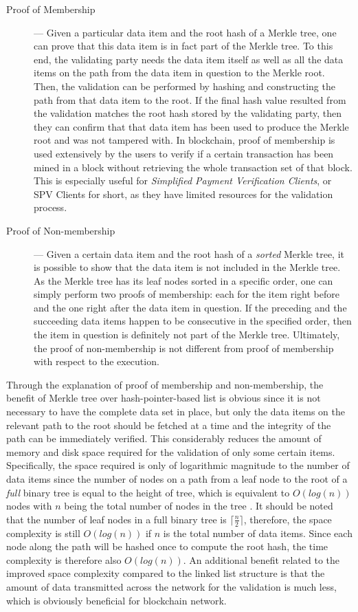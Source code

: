 \begin{description}
	\item[Proof of Membership] --- Given a particular data item and the root hash of a Merkle tree, one can prove that this data item is in fact part of the Merkle tree. To this end, the validating party needs the data item itself as well as all the data items on the path from the data item in question to the Merkle root. Then, the validation can be performed by hashing and constructing the path from that data item to the root. If the final hash value resulted from the validation matches the root hash stored by the validating party, then they can confirm that that data item has been used to produce the Merkle root and was not tampered with.	In blockchain, proof of membership is used extensively by the users to verify if a certain transaction has been mined in a block without retrieving the whole transaction set of that block. This is especially useful for \textit{Simplified Payment Verification Clients}, or SPV Clients for short, \cite{satoshi2008peer} as they have limited resources for the validation process.
	\item[Proof of Non-membership] --- Given a certain data item and the root hash of a \textit{sorted} Merkle tree, it is possible to show that the data item is not included in the Merkle tree. As the Merkle tree has its leaf nodes sorted in a specific order, one can simply perform two proofs of membership: each for the item right before and the one right after the data item in question. If the preceding and the succeeding data items happen to be consecutive in the specified order, then the item in question is definitely not part of the Merkle tree. Ultimately, the proof of non-membership is not different from proof of membership with respect to the execution.  
\end{description}

Through the explanation of proof of membership and non-membership, the benefit of Merkle tree over hash-pointer-based list is obvious since it is not necessary to have the complete data set in place, but only the data items on the relevant path to the root should be fetched at a time and the integrity of the path can be immediately verified. This considerably reduces the amount of memory and disk space required for the validation of only some certain items. Specifically, the space required is only of logarithmic magnitude to the number of data items since the number of nodes on a path from a leaf node to the root of a \textit{full} binary tree is equal to the height of tree, which is equivalent to $O(log(n))$ nodes with $n$ being the total number of nodes in the tree \cite{knuth1998vol3}. It should be noted that the number of leaf nodes in a full binary tree is $\lceil \frac{n}{2} \rceil$, therefore, the space complexity is still $O(log(n))$ if $n$ is the total number of data items. Since each node along the path will be hashed once to compute the root hash, the time complexity is therefore also $O(log(n))$. An additional benefit related to the improved space complexity compared to the linked list structure is that the amount of data transmitted across the network for the validation is much less, which is obviously beneficial for blockchain network.

